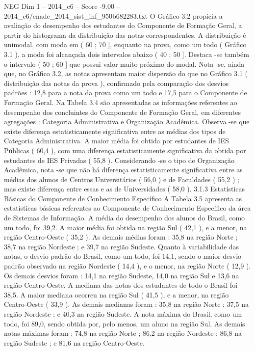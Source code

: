 \begin{textsample}{NEG Dim 1 – 2014\_c6 – Score -9.00 – 2014\_c6/enade\_2014\_sist\_inf\_950b682283.txt}
O Gráfico 3.2 propicia a avaliação do desempenho dos estudantes do Componente de Formação Geral, a partir do histograma da distribuição das notas correspondentes.
A distribuição é unimodal, com moda em ( 60 ; 70 ], enquanto na prova, como um todo ( Gráfico 3.1 ), a moda foi alcançada dois intervalos abaixo ( 40 ; 50 ].
Destaca -se também o intervalo ( 50 ; 60 ] que possui valor muito próximo do modal.
Nota -se, ainda que, no Gráfico 3.2, as notas apresentam maior dispersão do que no Gráfico 3.1 ( distribuição das notas da prova ), confirmado pela comparação dos desvios padrões : 12,8 para a nota da prova como um todo e 17,5 para o Componente de Formação Geral.
Na Tabela 3.4 são apresentadas as informações referentes ao desempenho dos concluintes do Componente de Formação Geral, em diferentes agregações : Categoria Administrativa e Organização Acadêmica.
Observa -se que existe diferença estatisticamente significativa entre as médias dos tipos de Categoria Administrativa.
A maior média foi obtida por estudantes de IES Públicas ( 60,4 ), com uma diferença estatisticamente significativa da obtida por estudantes de IES Privadas ( 55,8 ).
Considerando -se o tipo de Organização Acadêmica, nota -se que não há diferença estatisticamente significativa entre as médias dos alunos de Centros Universitários ( 56,0 ) e de Faculdades ( 55,2 ) ; mas existe diferença entre essas e as de Universidades ( 58,0 ). 3.1.3 Estatísticas Básicas do Componente de Conhecimento Específico A Tabela 3.5 apresenta as estatísticas básicas referentes ao Componente de Conhecimento Específico da área de Sistemas de Informação.
A média do desempenho dos alunos do Brasil, como um todo, foi 39,2.
A maior média foi obtida na região Sul ( 42,1 ), e a menor, na região Centro-Oeste ( 35,2 ).
As demais médias foram : 35,8 na região Norte ; 38,7 na região Nordeste ; e 39,7 na região Sudeste.
Quanto à variabilidade das notas, o desvio padrão do Brasil, como um todo, foi 14,1, sendo o maior desvio padrão observado na região Nordeste ( 14,4 ), e o menor, na região Norte ( 12,9 ).
Os demais desvios foram : 14,1 na região Sudeste, 14,0 na região Sul e 13,6 na região Centro-Oeste.
A mediana das notas dos estudantes de todo o Brasil foi 38,5.
A maior mediana ocorreu na região Sul ( 41,5 ), e a menor, na região Centro-Oeste ( 33,9 ).
As demais medianas foram : 35,8 na região Norte ; 37,5 na região Nordeste ; e 40,3 na região Sudeste.
A nota máxima do Brasil, como um todo, foi 89,0, sendo obtida por, pelo menos, um aluno na região Sul.
As demais notas máximas foram : 74,8 na região Norte ; 86,2 na região Nordeste ; 86,8 na região Sudeste ; e 81,6 na região Centro-Oeste.

\end{textsample}
